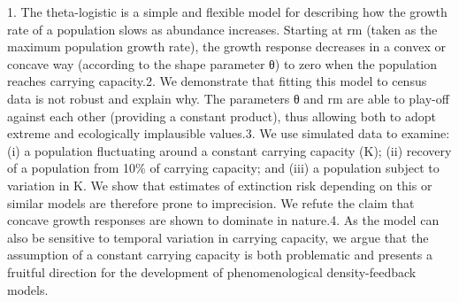 1. The theta-logistic is a simple and flexible model for describing how the growth rate of a population slows as abundance increases. Starting at rm (taken as the maximum population growth rate), the growth response decreases in a convex or concave way (according to the shape parameter θ) to zero when the population reaches carrying capacity.2. We demonstrate that fitting this model to census data is not robust and explain why. The parameters θ and rm are able to play-off against each other (providing a constant product), thus allowing both to adopt extreme and ecologically implausible values.3. We use simulated data to examine: (i) a population fluctuating around a constant carrying capacity (K); (ii) recovery of a population from 10\% of carrying capacity; and (iii) a population subject to variation in K. We show that estimates of extinction risk depending on this or similar models are therefore prone to imprecision. We refute the claim that concave growth responses are shown to dominate in nature.4. As the model can also be sensitive to temporal variation in carrying capacity, we argue that the assumption of a constant carrying capacity is both problematic and presents a fruitful direction for the development of phenomenological density-feedback models.